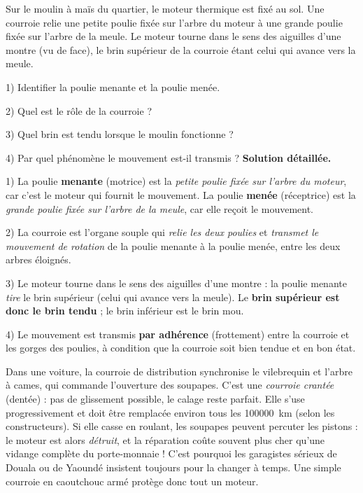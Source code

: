\documentclass[11pt]{article}
\newcommand{\cle}[1]{{\popxbold\color{popdark}#1}}
\begin{document}
\begin{exoresolu}
Sur le moulin à maïs du quartier, le moteur thermique est fixé au sol. Une courroie relie une petite poulie fixée sur l'arbre du moteur à une grande poulie fixée sur l'arbre de la meule. Le moteur tourne dans le sens des aiguilles d'une montre (vu de face), le brin supérieur de la courroie étant celui qui avance vers la meule.

1) Identifier la poulie menante et la poulie menée.

2) Quel est le rôle de la courroie ?

3) Quel brin est tendu lorsque le moulin fonctionne ?

4) Par quel phénomène le mouvement est-il transmis ?
\tcblower
\textbf{Solution détaillée.}

1) La poulie \textbf{menante} (motrice) est la \emph{petite poulie fixée sur l'arbre du moteur}, car c'est le moteur qui fournit le mouvement. La poulie \textbf{menée} (réceptrice) est la \emph{grande poulie fixée sur l'arbre de la meule}, car elle reçoit le mouvement.

2) La courroie est l'organe souple qui \emph{relie les deux poulies} et \emph{transmet le mouvement de rotation} de la poulie menante à la poulie menée, entre les deux arbres éloignés.

3) Le moteur tourne dans le sens des aiguilles d'une montre : la poulie menante \emph{tire} le brin supérieur (celui qui avance vers la meule). Le \textbf{brin supérieur est donc le brin tendu} ; le brin inférieur est le brin mou.

4) Le mouvement est transmis \textbf{par adhérence} (frottement) entre la courroie et les gorges des poulies, à condition que la courroie soit bien tendue et en bon état.
\end{exoresolu}

\begin{savaistu}
Dans une voiture, la \cle{courroie de distribution} synchronise le vilebrequin et l'arbre à cames, qui commande l'ouverture des soupapes. C'est une \emph{courroie crantée} (dentée) : pas de glissement possible, le calage reste parfait. Elle s'use progressivement et doit être remplacée environ tous les \SI{100000}{km} (selon les constructeurs). Si elle casse en roulant, les soupapes peuvent percuter les pistons : le moteur est alors \emph{détruit}, et la réparation coûte souvent plus cher qu'une vidange complète du porte-monnaie ! C'est pourquoi les garagistes sérieux de Douala ou de Yaoundé insistent toujours pour la changer à temps. Une simple courroie en caoutchouc armé protège donc tout un moteur.
\end{savaistu}
\end{document}
